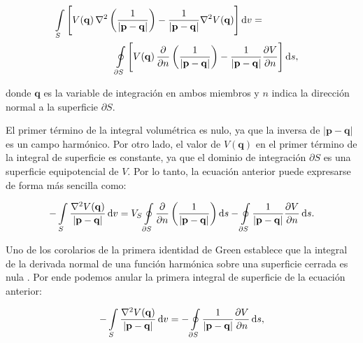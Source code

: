 \begin{equation}
    \begin{split}
    \int\limits_S
        \Bigg[
            V(\mathbf{q}) \,
            \nabla^2 \left( \frac{1}{|\mathbf{p} - \mathbf{q}|} \right)
            - \frac{1}{|\mathbf{p} - \mathbf{q}|}  \nabla^2 V(\mathbf{q})
        \Bigg]
    \mathop{}\!\textnormal{d} v
    = \\
    \oint\limits_{\partial S}
        \Bigg[
            V(\mathbf{q}) \,
            \frac{\partial}{\partial n}
            \left( \frac{1}{|\mathbf{p} - \mathbf{q}|} \right)
            -
            \frac{1}{|\mathbf{p} - \mathbf{q}|}
            &\frac{\partial V}{\partial n}
        \Bigg]
    \mathop{}\!\textnormal{d} s,
    \end{split}
\end{equation}

\noindent donde $\mathbf{q}$ es la variable de integración en ambos miembros
y $n$ indica la dirección normal a la superficie $\partial S$.

El primer término de la integral volumétrica es nulo, ya que la inversa de
$|\mathbf{p} - \mathbf{q}|$ es un campo harmónico.
Por otro lado, el valor de $V(\mathbf{q})$ en el primer término de la integral
de superficie es constante, ya que el dominio de integración $\partial S$ es
una superficie equipotencial de $V$.
Por lo tanto, la ecuación anterior puede expresarse de forma más sencilla como:

\begin{equation}
    - \int\limits_S
        \frac{\nabla^2 V(\mathbf{q})}{|\mathbf{p} - \mathbf{q}|}
    \mathop{}\!\textnormal{d} v
    =
    V_S
    \oint\limits_{\partial S}
        \frac{\partial}{\partial n}
        \left( \frac{1}{|\mathbf{p} - \mathbf{q}|} \right)
    \mathop{}\!\textnormal{d} s
    - \oint\limits_{\partial S}
        \frac{1}{|\mathbf{p} - \mathbf{q}|}
        \frac{\partial V}{\partial n}
    \mathop{}\!\textnormal{d} s.
\end{equation}

Uno de los corolarios de la primera identidad de Green establece que la
integral de la derivada normal de una función harmónica  sobre una superficie
cerrada es nula \citep[][p.~20]{blakely1995}. Por ende podemos anular la
primera integral de superficie de la ecuación anterior:

\begin{equation}
    - \int\limits_S
        \frac{\nabla^2 V(\mathbf{q})}{|\mathbf{p} - \mathbf{q}|}
    \mathop{}\!\textnormal{d} v
    =
    - \oint\limits_{\partial S}
        \frac{1}{|\mathbf{p} - \mathbf{q}|}
        \frac{\partial V}{\partial n}
    \mathop{}\!\textnormal{d} s,
\end{equation}

